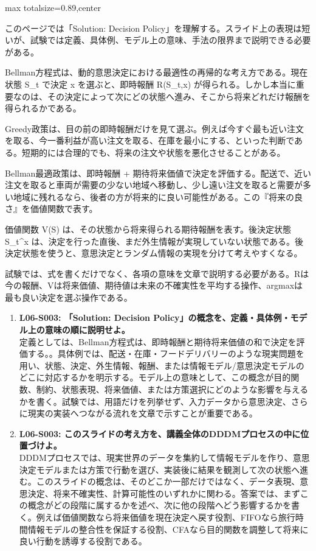 \begin{minipage}[t]{0.58\textwidth}
\begin{adjustbox}{max totalsize={\textwidth}{0.89\textheight},center}
\begin{minipage}{\textwidth}\scriptsize
{}このページでは「Solution: Decision Policy」を理解する。スライド上の表現は短いが、試験では定義、具体例、モデル上の意味、手法の限界まで説明できる必要がある。\par
Bellman方程式は、動的意思決定における最適性の再帰的な考え方である。現在状態 S\_t で決定 x を選ぶと、即時報酬 R(S\_t,x) が得られる。しかし本当に重要なのは、その決定によって次にどの状態へ進み、そこから将来どれだけ報酬を得られるかである。\par
Greedy政策は、目の前の即時報酬だけを見て選ぶ。例えば今すぐ最も近い注文を取る、今一番利益が高い注文を取る、在庫を最小にする、といった判断である。短期的には合理的でも、将来の注文や状態を悪化させることがある。\par
Bellman最適政策は、即時報酬 + 期待将来価値で決定を評価する。配送で、近い注文を取ると車両が需要の少ない地域へ移動し、少し遠い注文を取ると需要が多い地域に残れるなら、後者の方が将来的に良い可能性がある。この『将来の良さ』を価値関数で表す。\par
価値関数 V(S) は、その状態から将来得られる期待報酬を表す。後決定状態 S\_t\textasciicircum{}x は、決定を行った直後、まだ外生情報が実現していない状態である。後決定状態を使うと、意思決定とランダム情報の実現を分けて考えやすくなる。\par
試験では、式を書くだけでなく、各項の意味を文章で説明する必要がある。Rは今の報酬、Vは将来価値、期待値は未来の不確実性を平均する操作、argmaxは最も良い決定を選ぶ操作である。\par{}\begin{enumerate}\item \textbf{L06-S003: 「Solution: Decision Policy」の概念を、定義・具体例・モデル上の意味の順に説明せよ。}\\定義としては、Bellman方程式は、即時報酬と期待将来価値の和で決定を評価する。。具体例では、配送・在庫・フードデリバリーのような現実問題を用い、状態、決定、外生情報、報酬、または情報モデル/意思決定モデルのどこに対応するかを明示する。モデル上の意味として、この概念が目的関数、制約、状態表現、将来価値、または方策選択にどのような影響を与えるかを書く。試験では、用語だけを列挙せず、入力データから意思決定、さらに現実の実装へつながる流れを文章で示すことが重要である。\item \textbf{L06-S003: このスライドの考え方を、講義全体のDDDMプロセスの中に位置づけよ。}\\DDDMプロセスでは、現実世界のデータを集約して情報モデルを作り、意思決定モデルまたは方策で行動を選び、実装後に結果を観測して次の状態へ進む。このスライドの概念は、そのどこか一部だけではなく、データ表現、意思決定、将来不確実性、計算可能性のいずれかに関わる。答案では、まずこの概念がどの段階に属するかを述べ、次に他の段階へどう影響するかを書く。例えば価値関数なら将来価値を現在決定へ戻す役割、FIFOなら旅行時間情報モデルの整合性を保証する役割、CFAなら目的関数を調整して将来に良い行動を誘導する役割である。\end{enumerate}

\end{minipage}
\end{adjustbox}
\end{minipage}
